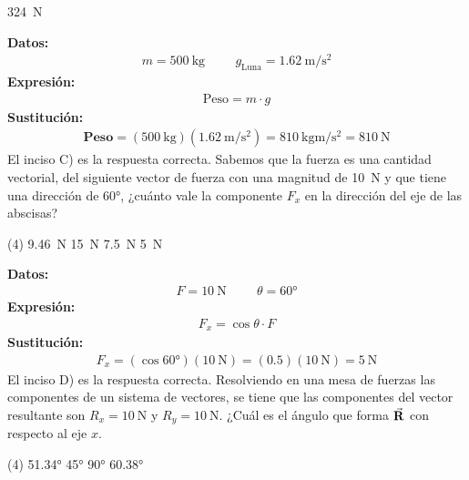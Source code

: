 \documentclass[12pt, letter]{exam}
\begin{document}
\begin{questions}
\begin{tasks}
        \task \SI{324}{\newton}
    \end{tasks}
    \textbf{Datos:}
    \begin{align*}
    m =  \SI{500}{\kilo\gram} \hspace{1cm} g_{\text{Luna}} = \SI[per-mode=fraction]{1.62}{\meter\per\square\second}
    \end{align*}
    \textbf{Expresión:}
    \begin{align*}
    \text{Peso} = m \cdot g
    \end{align*}
    \textbf{Sustitución:}
    \begin{align*}
    \textbf{Peso} = \left( \SI{500}{\kilo\gram} \right) \left( \SI[per-mode=fraction]{1.62}{\meter\per\square\second} \right) = \SI[per-mode=fraction]{810}{\kilo\gram\meter\per\square\second} = \SI{810}{\newton}
    \end{align*}
    El inciso C) es la respuesta correcta.
    \question Sabemos que la fuerza es una cantidad vectorial, del siguiente vector de fuerza con una magnitud de \SI{10}{\newton} y que tiene una dirección de \ang{60}, ¿cuánto vale la componente $F_{x}$ en la dirección del eje de las abscisas?
    \begin{tasks}(4)
        \task \SI{9.46}{\newton}
        \task \SI{15}{\newton}
        \task \SI{7.5}{\newton}
        \task \SI{5}{\newton}
    \end{tasks}
    \textbf{Datos:}
    \begin{align*}
    F = \SI{10}{\newton} \hspace{1cm} \theta = \ang{60}
    \end{align*}
    \textbf{Expresión:}
    \begin{align*}
    F_{x} = \cos \theta \cdot F
    \end{align*}
    \textbf{Sustitución:}
    \begin{align*}
    F_{x} = \left( \cos \ang{60} \right) \left( \SI{10}{\newton} \right) = \left( 0.5 \right) \left( \SI{10}{\newton} \right) = \SI{5}{\newton}
    \end{align*}
    El inciso D) es la respuesta correcta.
    \question Resolviendo en una mesa de fuerzas las componentes de un sistema de vectores, se tiene que las componentes del vector resultante son $R_{x} = \SI{10}{\newton}$ y $R_{y} = \SI{10}{\newton}$. ¿Cuál es el ángulo que forma $\va{R}$ con respecto al eje $x$.
    \begin{tasks}(4)
        \task \ang{51.34}
        \task \ang{45}
        \task \ang{90}
        \task \ang{60.38}
    \end{tasks}

\end{questions}
\end{document}
